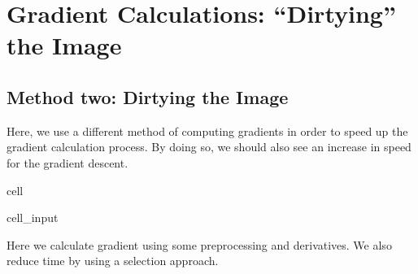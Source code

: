 \documentclass[letterpaper,10pt,english]{jupyterBook}
\begin{document}
\chapter{Gradient Calculations: “Dirtying” the Image}
\label{\detokenize{dirty_gradient:gradient-calculations-dirtying-the-image}}\label{\detokenize{dirty_gradient::doc}}

\section{Method two: Dirtying the Image}
\label{\detokenize{dirty_gradient:method-two-dirtying-the-image}}
\sphinxAtStartPar
Here, we use a different method of computing gradients in order to speed up the gradient calculation process. By doing so, we should also see an increase in speed for the gradient descent.

\begin{sphinxuseclass}{cell}\begin{sphinxVerbatimInput}

\begin{sphinxuseclass}{cell_input}
\begin{sphinxVerbatim}[commandchars=\\\{\}]
   
   
  
\end{sphinxVerbatim}

\end{sphinxuseclass}\end{sphinxVerbatimInput}

\end{sphinxuseclass}
\sphinxAtStartPar
Here we calculate gradient using some preprocessing and derivatives. We also reduce time by using a selection approach.
\end{document}

